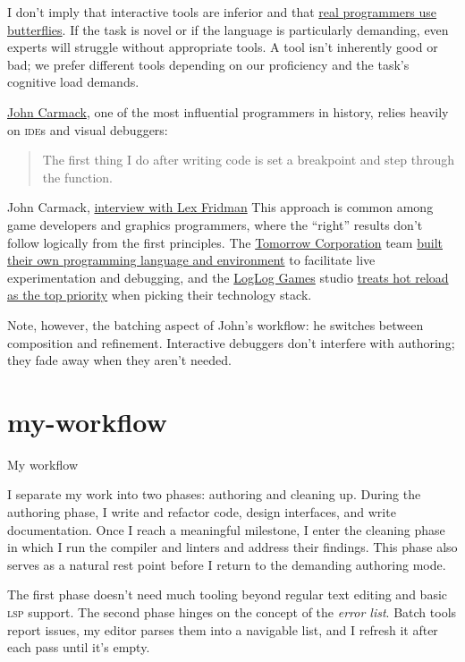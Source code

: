 \documentclass{article}
\begin{document}
I don't imply that interactive tools are inferior and that \href{https://xkcd.com/378/}{real programmers use butterflies}.
If the task is novel or if the language is particularly demanding,
even experts will struggle without appropriate tools.
A tool isn't inherently good or bad;
we prefer different tools depending on our proficiency
and the task's cognitive load demands.

\href{https://en.wikipedia.org/wiki/John_Carmack}{John Carmack},
one of the most influential programmers in history,
relies heavily on \textsc{ide}s and visual debuggers:

\blockquote{
  The first thing I do after writing code is set a breakpoint and step through the function.
}{
  John Carmack, \href{https://www.youtube.com/watch?v=tzr7hRXcwkw}{interview with Lex Fridman}
}
This approach is common among game developers and graphics programmers,
where the ``right'' results don't follow logically from the first principles.
The \href{https://tomorrowcorporation.com/}{Tomorrow Corporation} team
\href{https://www.youtube.com/watch?v=72y2EC5fkcE}{built their own programming language and environment}
to facilitate live experimentation and debugging,
and the \href{https://loglog.games/}{LogLog Games} studio \href{https://loglog.games/blog/leaving-rust-gamedev/#hot-reloading-is-more-important-for-iteration-speed-than-people-give-it-credit-for}{treats hot reload as the top priority} when picking their technology stack.

Note, however, the batching aspect of John's workflow:
he switches between composition and refinement.
Interactive debuggers don't interfere with authoring;
they fade away when they aren't needed.

\section{my-workflow}{My workflow}

I separate my work into two phases: authoring and cleaning up.
During the authoring phase,
I write and refactor code, design interfaces, and write documentation.
Once I reach a meaningful milestone,
I enter the cleaning phase in which I run the compiler and linters and address their findings.
This phase also serves as a natural rest point before I return to the demanding authoring mode.

The first phase doesn't need much tooling beyond regular text editing and basic \textsc{lsp} support.
The second phase hinges on the concept of the \emph{error list}.
Batch tools report issues,
my editor parses them into a navigable list,
and I refresh it after each pass until it's empty.
\end{document}
